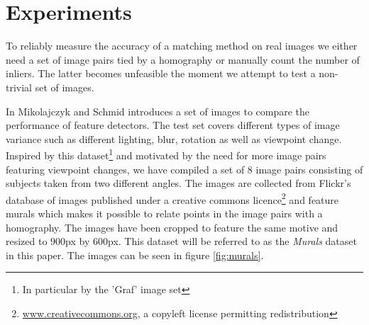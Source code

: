 \documentclass[conference]{IEEEtran}
\begin{document}
%

\section{Experiments}
\label{experiment}
%
To reliably measure the accuracy of a matching method on real images we 
either need a set of image pairs tied by a homography or manually count 
the number of inliers. The latter becomes unfeasible the moment we 
attempt to test a non-trivial set of images. 

In \cite{mikolajczyk2005performance} Mikolajczyk and Schmid introduces a 
set of images to compare the performance of feature detectors. The test 
set covers different types of image variance such as different lighting, 
blur, rotation as well as viewpoint change. Inspired by this 
dataset\footnote{In particular by the 'Graf' image set} and motivated by 
the need for more image pairs featuring viewpoint changes, we have 
compiled a set of $8$ image pairs consisting of subjects taken from two 
different angles. The images are collected from Flickr's database of 
images published under a creative commons 
licence\footnote{\href{http://creativecommons.org/}{www.creativecommons.org}, 
a copyleft license permitting redistribution} and feature murals which 
makes it possible to relate points in the image pairs with a homography.  
The images have been cropped to feature the same motive and resized to 
$900$px by $600$px. This dataset will be referred to as the 
\emph{Murals} dataset in this paper. The images can be seen in figure 
\ref{fig:murals}.
\end{document}
